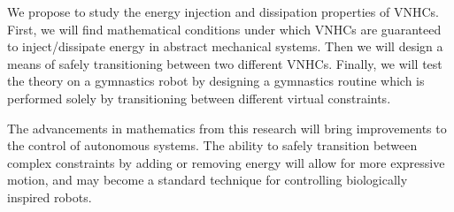\documentclass[a4paper,12pt]{article}
\begin{document}
We propose to study the energy injection and dissipation properties of VNHCs.
First, we will find mathematical conditions under which VNHCs are guaranteed to
inject/dissipate energy in abstract mechanical systems.
Then we will design a means of safely transitioning between two different VNHCs.
Finally, we will test the theory on a gymnastics robot by designing a gymnastics
routine which is performed solely by transitioning between different virtual
constraints.

The advancements in mathematics from this research will bring improvements to
the control of autonomous systems. 
The ability to safely transition between complex constraints by adding or
removing energy will allow for more expressive motion, and may become a standard
technique for controlling biologically inspired robots.

\printbibliography
\end{document}
